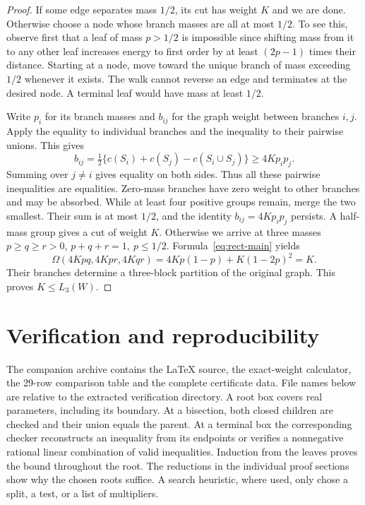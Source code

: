 \documentclass[11pt,a4paper]{article}
\theoremstyle{definition}
\begin{document}
\begin{proof}
If some edge separates mass \(1/2\), its cut has weight \(K\) and we are done. Otherwise choose a node whose branch masses are all at most \(1/2\). To see this, observe first that a leaf of mass \(p>1/2\) is impossible since shifting mass from it to any other leaf increases energy to first order by at least \((2p-1)\) times their distance. Starting at a node, move toward the unique branch of mass exceeding \(1/2\) whenever it exists. The walk cannot reverse an edge and terminates at the desired node. A terminal leaf would have mass at least \(1/2\).

Write \(p_i\) for its branch masses and \(b_{ij}\) for the graph weight between branches \(i,j\). Apply the equality to individual branches and the inequality to their pairwise unions. This gives
\[
 b_{ij}=\tfrac12\{c(S_i)+c(S_j)-c(S_i\cup S_j)\}\ge4Kp_ip_j .
\]
Summing over \(j\ne i\) gives equality on both sides. Thus all these pairwise inequalities are equalities. Zero-mass branches have zero weight to other branches and may be absorbed. While at least four positive groups remain, merge the two smallest. Their sum is at most \(1/2\), and the identity \(b_{ij}=4Kp_ip_j\) persists. A half-mass group gives a cut of weight \(K\). Otherwise we arrive at three masses \(p\ge q\ge r>0\), \(p+q+r=1,\ p\le1/2\). Formula~\eqref{eq:rect-main} yields
\[
 \Omega(4Kpq,4Kpr,4Kqr)
 =4Kp(1-p)+K(1-2p)^2=K .
\]
Their branches determine a three-block partition of the original graph. This proves \(K\le L_3(W)\).
\end{proof}

\section{Verification and reproducibility}\label{sec:verification}

The companion archive contains the LaTeX source, the exact-weight calculator, the 29-row comparison table and the complete certificate data. File names below are relative to the extracted verification directory. A root box covers real parameters, including its boundary. At a bisection, both closed children are checked and their union equals the parent. At a terminal box the corresponding checker reconstructs an inequality from its endpoints or verifies a nonnegative rational linear combination of valid inequalities. Induction from the leaves proves the bound throughout the root. The reductions in the individual proof sections show why the chosen roots suffice. A search heuristic, where used, only chose a split, a test, or a list of multipliers.
\end{document}
